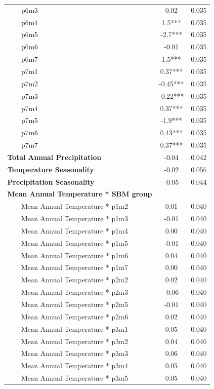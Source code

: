 \documentclass[
]{agujournal2019}
\begin{document}
\begin{longtable*}{lcc}
    p6m3 & 0.02 & 0.035 \\ 
    p6m4 & 1.5*** & 0.035 \\ 
    p6m5 & -2.7*** & 0.035 \\ 
    p6m6 & -0.01 & 0.035 \\ 
    p6m7 & 1.5*** & 0.035 \\ 
    p7m1 & 0.37*** & 0.035 \\ 
    p7m2 & -0.45*** & 0.035 \\ 
    p7m3 & -0.22*** & 0.035 \\ 
    p7m4 & 0.37*** & 0.035 \\ 
    p7m5 & -1.9*** & 0.035 \\ 
    p7m6 & 0.43*** & 0.035 \\ 
    p7m7 & 0.37*** & 0.035 \\ 
\textbf{Total Annual Precipitation} & -0.04 & 0.042 \\ 
\textbf{Temperature Seasonality} & -0.02 & 0.056 \\ 
\textbf{Precipitation Seasonality} & -0.05 & 0.044 \\ 
\textbf{Mean Annual Temperature * SBM group} &  &  \\ 
    Mean Annual Temperature * p1m2 & 0.01 & 0.040 \\ 
    Mean Annual Temperature * p1m3 & -0.01 & 0.040 \\ 
    Mean Annual Temperature * p1m4 & 0.00 & 0.040 \\ 
    Mean Annual Temperature * p1m5 & -0.01 & 0.040 \\ 
    Mean Annual Temperature * p1m6 & 0.04 & 0.040 \\ 
    Mean Annual Temperature * p1m7 & 0.00 & 0.040 \\ 
    Mean Annual Temperature * p2m2 & 0.02 & 0.040 \\ 
    Mean Annual Temperature * p2m3 & -0.06 & 0.040 \\ 
    Mean Annual Temperature * p2m5 & -0.01 & 0.040 \\ 
    Mean Annual Temperature * p2m6 & 0.02 & 0.040 \\ 
    Mean Annual Temperature * p3m1 & 0.05 & 0.040 \\ 
    Mean Annual Temperature * p3m2 & 0.04 & 0.040 \\ 
    Mean Annual Temperature * p3m3 & 0.06 & 0.040 \\ 
    Mean Annual Temperature * p3m4 & 0.05 & 0.040 \\ 
    Mean Annual Temperature * p3m5 & 0.05 & 0.040 \\ 

\end{longtable*}
\end{document}
